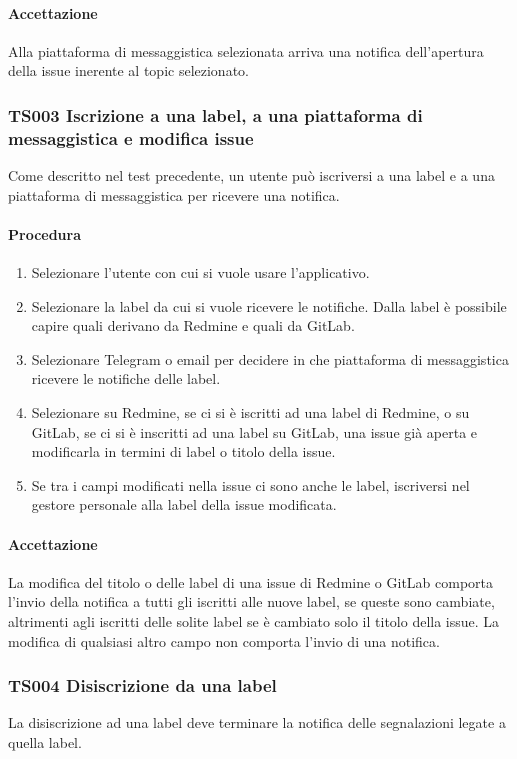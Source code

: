 		\paragraph*{Accettazione}
		Alla piattaforma di messaggistica selezionata arriva una notifica dell'apertura della issue inerente al topic selezionato.
		
	\subsubsection{TS003 Iscrizione a una label, a una piattaforma di messaggistica e modifica issue}
		Come descritto nel test precedente, un utente può iscriversi a una label e a una piattaforma di messaggistica per ricevere una notifica.
		
		\paragraph*{Procedura}
			\begin{enumerate}
				\item Selezionare l'utente con cui si vuole usare l'applicativo.
				\item Selezionare la label da cui si vuole ricevere le notifiche. Dalla label è possibile capire quali derivano da Redmine e quali da GitLab.
				\item Selezionare Telegram o email per decidere in che piattaforma di messaggistica ricevere le notifiche delle label.
				\item Selezionare su Redmine, se ci si è iscritti ad una label di Redmine, o su GitLab, se ci si è inscritti ad una label su GitLab, una issue già aperta e modificarla in termini di label o titolo della issue.
				\item Se tra i campi modificati nella issue ci sono anche le label, iscriversi nel gestore personale alla label della issue modificata.
			\end{enumerate}
		
		\paragraph*{Accettazione}
		La modifica del titolo o delle label di una issue di Redmine o GitLab comporta l'invio della notifica a tutti gli iscritti alle nuove label, se queste sono cambiate, altrimenti agli iscritti delle solite label se è cambiato solo il titolo della issue. La modifica di qualsiasi altro campo non comporta l'invio di una notifica.
		
	\subsubsection{TS004 Disiscrizione da una label}
		La disiscrizione ad una label deve terminare la notifica delle segnalazioni legate a quella label.
		
